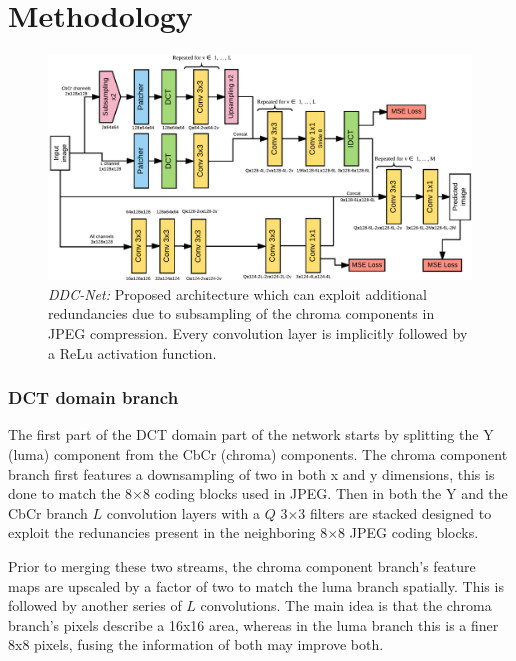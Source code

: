 \chapter{Methodology}

\begin{figure}[ht]
    \hspace{-1.5cm}\centering
        \includegraphics[width=1.1\textwidth]{../graphics/architecture.png}
    \caption[Short caption to special figure]{\textit{DDC-Net:} Proposed architecture which can exploit additional redundancies due to subsampling of the chroma components in JPEG compression. Every convolution layer is implicitly followed by a ReLu activation function.}
    \label{fig_archy}
\end{figure}


\subsection{DCT domain branch}
The first part of the DCT domain part of the network starts by splitting the Y (luma) component from the CbCr (chroma) components. The chroma component branch first features a downsampling of two in both x and y dimensions, this is done to match the 8$\times$8 coding blocks used in JPEG. Then in both the Y and the CbCr branch $L$ convolution layers with a $Q$ 3$\times$3 filters are stacked designed to exploit the redunancies present in the neighboring 8$\times$8 JPEG coding blocks. 

Prior to merging these two streams, the chroma component branch's feature maps are upscaled by a factor of two to match the luma branch spatially. This is followed by another series of $L$ convolutions. The main idea is that the chroma branch's pixels describe a 16x16 area, whereas in the luma branch this is a finer 8x8 pixels, fusing the information of both may improve both.

